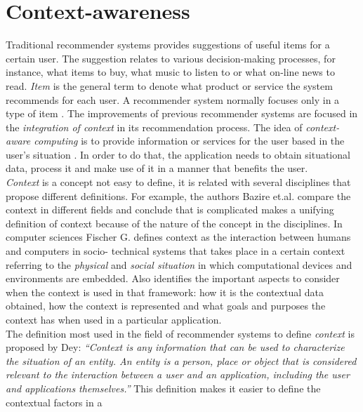 \section{Context-awareness} \label{context-awareness}

Traditional recommender systems provides suggestions of useful items
for a certain user. The suggestion relates to various  decision-making
processes, for instance, what items to buy, what music to listen to or
what on-line news to read. \textit{Item} is the general term to denote
what product or service the system recommends for each user. A
recommender system normally focuses only in a type of item
\cite{resnick1997recommender}.
The improvements of previous recommender systems are focused in the
\textit{integration of context} in its recommendation process. 
The idea of \textit{context-aware computing} is to provide
information or services for the user based in the user's situation
\cite{dey2001understanding}. In order to do that, the application 
needs to obtain situational data, process it and make use of it 
in a manner that benefits the user. \\ 
\textit{Context} is a concept not easy to define, it is related with
several disciplines that propose different definitions. For example,
the authors Bazire et.al.\cite{bazire2005understanding} compare the
context in different fields and conclude that is complicated makes a
unifying definition of context because of the nature of the concept in
the disciplines. In computer sciences Fischer
G.\cite{fischer2012context} defines context as the interaction between
humans and computers in socio- technical systems that takes place in a
certain context referring to the \textit{physical} and \textit{social
situation} in which  computational devices and environments are
embedded. Also identifies the important aspects to consider when the
context is used in that framework: how it is the contextual data
obtained, how the context is represented and what goals and purposes
the context has when used in a particular application. \\
The definition most used in the field of recommender systems to
define \textit{context} is proposed by Dey\cite{dey2001understanding}:
\textit{``Context is any information that can be used to characterize
the situation of an entity. An entity is a person, place or object
that is considered relevant to the interaction between a user and  an
application, including the user and applications themselves.''}  This
definition makes it easier to define the contextual factors in a
